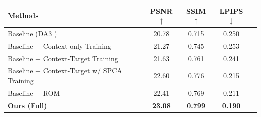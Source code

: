 \setlength{\tabcolsep}{6pt}
\renewcommand{\arraystretch}{1.2}

\begin{tabular}{l | cccc}
\toprule
Methods & PSNR$\uparrow$ & SSIM$\uparrow$ & LPIPS$\downarrow$ \\
\midrule
Baseline (DA3 \cite{lin2025da3})  & 20.78 & 0.715 & 0.250 \\
Baseline + Context-only Training & 21.27 & 0.745 & 0.253 \\
Baseline + Context-Target Training & 21.63 & 0.761 & 0.241 \\
Baseline + Context-Target w/ SPCA Training & 22.60 & 0.776 & 0.215 \\
Baseline + ROM & 22.41 & 0.769 & 0.211\\
\textbf{Ours (Full)} & \textbf{23.08} & \textbf{0.799}	& \textbf{0.190} \\
\bottomrule
\end{tabular}
